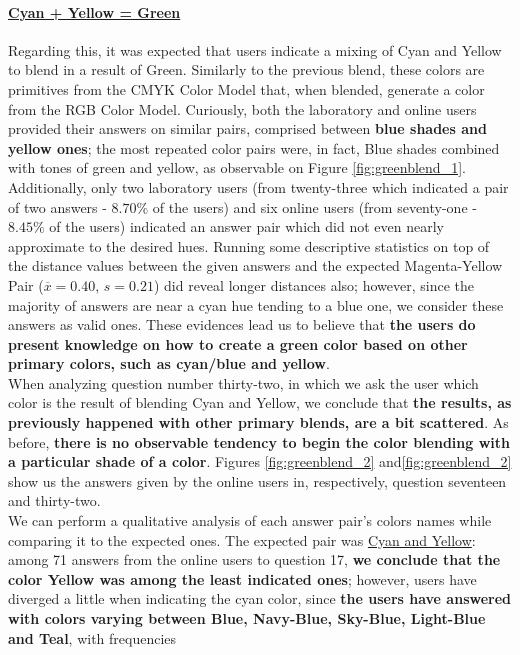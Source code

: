 \paragraph{\ul{Cyan + Yellow = Green}}
%
Regarding this, it was expected that users indicate a mixing of Cyan and Yellow to blend in a result of Green. Similarly to the previous blend, these colors are primitives from the CMYK Color Model that, when blended,
generate a color from the RGB Color Model. Curiously, both the laboratory and online users provided their answers on similar pairs, comprised between \textbf{blue shades and yellow ones}; the most repeated
color pairs were, in fact, Blue shades combined with tones of green and yellow, as observable on Figure \ref{fig:greenblend_1}. \\
%
Additionally, only two laboratory users (from twenty-three which indicated a pair of two answers - $8.70\%$ of the users) and six online users (from seventy-one - $8.45\%$ of the users) indicated an answer pair which did not even
nearly approximate to the desired hues. Running some descriptive statistics on top of the distance values between the given answers and the expected Magenta-Yellow Pair ($\overline{x} = 0.40$, $s = 0.21$) did reveal longer distances
also; however, since the majority of answers are near a cyan hue tending to a blue one, we consider these answers as valid ones. These evidences lead us to believe that \textbf{the users do present knowledge on how to create a green color
based on other primary colors, such as cyan/blue and yellow}. \\
%
When analyzing question number thirty-two, in which we ask the user which color is the result of blending Cyan and Yellow, we conclude that \textbf{the results, as previously happened with other primary blends, are a bit scattered}.
As before, \textbf{there is no observable tendency to begin the color blending with a particular shade of a color}. Figures \ref{fig:greenblend_2} and\ref{fig:greenblend_2} show us the answers given by the online users in, respectively,
question seventeen and thirty-two. \\
%
We can perform a qualitative analysis of each answer pair's colors names while comparing it to the expected ones. The
expected pair was \ul{Cyan and Yellow}: among 71 answers from the online users to question 17, \textbf{we conclude
that the color Yellow was among the least indicated ones}; however, users have diverged a little when indicating the cyan
color, since \textbf{the users have answered with colors varying between Blue, Navy-Blue, Sky-Blue, Light-Blue and Teal}, with frequencies

